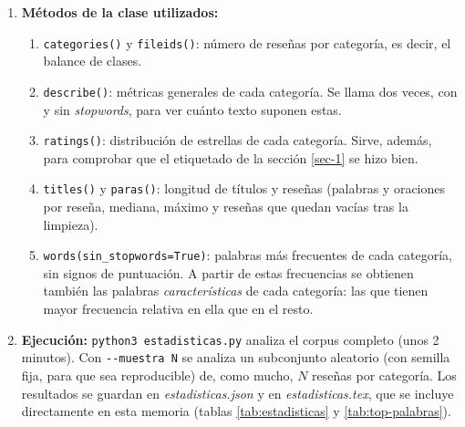 \documentclass[10pt,a4paper]{article}
\begin{document}
\begin{enumerate}
    \item \textbf{Métodos de la clase utilizados:}
    \begin{enumerate}
        \item \texttt{categories()} y \texttt{fileids()}: número de reseñas por categoría, es decir, el balance de clases.
        \item \texttt{describe()}: métricas generales de cada categoría. Se llama dos veces, con y sin \textit{stopwords},
        para ver cuánto texto suponen estas.
        \item \texttt{ratings()}: distribución de estrellas de cada categoría. Sirve, además, para comprobar que el
        etiquetado de la sección \ref{sec-1} se hizo bien.
        \item \texttt{titles()} y \texttt{paras()}: longitud de títulos y reseñas (palabras y oraciones por reseña, mediana,
        máximo y reseñas que quedan vacías tras la limpieza).
        \item \texttt{words(sin\_stopwords=True)}: palabras más frecuentes de cada categoría, sin signos de puntuación.
        A partir de estas frecuencias se obtienen también las palabras \textit{características} de cada categoría:
        las que tienen mayor frecuencia relativa en ella que en el resto.
    \end{enumerate}
    \item \textbf{Ejecución:} \texttt{python3 estadisticas.py} analiza el corpus completo (unos 2 minutos). Con
    \texttt{-{}-muestra N} se analiza un subconjunto aleatorio (con semilla fija, para que sea reproducible) de, como
    mucho, $N$ reseñas por categoría. Los resultados se guardan en \textit{estadisticas.json} y en \textit{estadisticas.tex},
    que se incluye directamente en esta memoria (tablas \ref{tab:estadisticas} y \ref{tab:top-palabras}).
\end{enumerate}
\end{document}
